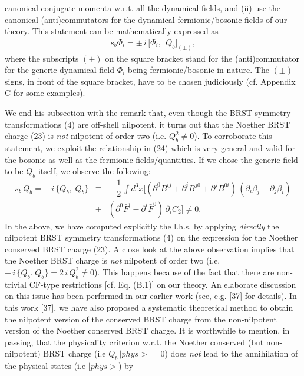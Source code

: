 \documentclass[12pt]{article}
\begin{document}
canonical conjugate momenta w.r.t. all the dynamical fields, and (ii) use the  canonical (anti)commutators for the dynamical fermionic/bosonic
fields of our theory.
This statement can be mathematically expressed as 
\begin{eqnarray}\label{24}
s_b \Phi_i = \pm\, i\, \Big [\Phi_i, \;\, Q_b \Big ]_{(\pm)},
\end{eqnarray}
where the subscripts $(\pm)$ on the square bracket stand for the (anti)commutator for the generic dynamical field $\Phi_i$ being
fermionic/bosonic in nature. The $(\pm)$ signs, in front of the square bracket, have to be chosen judiciously (cf. Appendix C for some examples).



We end his subsection with the remark that, even though the BRST symmetry transformations (4) are off-shell nilpotent, it turns out that the 
Noether BRST charge (23) is {\it not} nilpotent of order two (i.e. $Q_b^2 \neq 0 $). To corroborate this statement, we exploit the relationship in 
(24) which is very general and valid for the bosonic as well as the fermionic fields/quantities.  If we chose the generic field
to be $Q_b$ itself, we observe the following:
\begin{eqnarray}\label{25}
s_b \, Q_b = +\, i\, \big \{Q_b, \; Q_b \big \} &\equiv& -\, \dfrac{1}{2}\,\int d^3 x \Big [(\partial^0 B^{ij} 
+ \partial^i B^{j0} + \partial^j B^{0i})\,(\partial_i \beta_j- \partial_j \beta_i) \nonumber\\
&+& (\partial^0 \bar F^i - \partial^i \bar F^0)\, \partial_i C_2\Big ] \neq 0.
\end{eqnarray}
In the above, we have computed explicitly the l.h.s. by applying {\it directly} the 
nilpotent BRST symmetry transformations (4) on the expression for the Noether conserved BRST charge (23).
A close look at the above observation implies that the Noether BRST charge is {\it not} nilpotent of order two (i.e.
$+\,i\,\{Q_b. \; Q_b \} =  2\,i\, Q_b^2 \neq 0$). This happens because of the fact that there are non-trivial CF-type restrictions [cf. Eq. (B.1)] 
on our theory. An elaborate discussion on this issue has been performed in our earlier work (see, e.g. [37] for details). In this work [37], we have
also proposed a systematic theoretical method to obtain the nilpotent version of the 
conserved BRST charge from the non-nilpotent version of the Noether 
conserved BRST charge. It is worthwhile to mention, in passing, that the physicality criterion w.r.t. the Noether conserved 
(but non-nilpotent) BRST charge (i.e $Q_b \, |phys> = 0$) does {\it not} lead to the annihilation of the physical states (i.e $|phys> $) by
\end{document}
